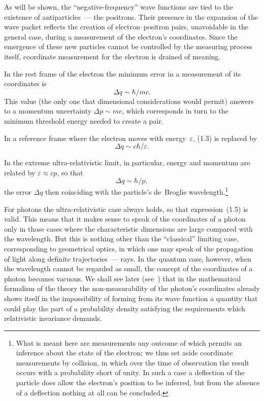 As will be shown, the ``negative-frequency'' wave functions are tied to the existence of antiparticles~--- the positrons. Their presence in the expansion of the wave packet reflects the creation of electron--positron pairs, unavoidable in the general case, during a measurement of the electron's coordinates. Since the emergence of these new particles cannot be controlled by the measuring process itself, coordinate measurement for the electron is drained of meaning.

In the rest frame of the electron the minimum error in a measurement of its coordinates is
\begin{equation}
\Delta q \sim \hbar/mc.
\tag{1.3}
\end{equation}
This value (the only one that dimensional considerations would permit) answers to a momentum uncertainty $\Delta p \sim mc$, which corresponds in turn to the minimum threshold energy needed to create a pair.

In a reference frame where the electron moves with energy~$\varepsilon$, (1.3) is replaced by
\begin{equation}
\Delta q \sim c\hbar/\varepsilon.
\tag{1.4}
\end{equation}

In the extreme ultra-relativistic limit, in particular, energy and momentum are related by $\varepsilon \approx cp$, so that
\begin{equation}
\Delta q \sim \hbar/p,
\tag{1.5}
\end{equation}
the error $\Delta q$ then coinciding with the particle's de~Broglie wavelength.\footnote{What is meant here are measurements any outcome of which permits an inference about the state of the electron; we thus set aside coordinate measurements by collision, in which over the time of observation the result occurs with a probability short of unity. In such a case a deflection of the particle does allow the electron's position to be inferred, but from the absence of a deflection nothing at all can be concluded.}

For photons the ultra-relativistic case always holds, so that expression~(1.5) is valid. This means that it makes sense to speak of the coordinates of a photon only in those cases where the characteristic dimensions are large compared with the wavelength. But this is nothing other than the ``classical'' limiting case, corresponding to geometrical optics, in which one may speak of the propagation of light along definite trajectories~--- rays. In the quantum case, however, when the wavelength cannot be regarded as small, the concept of the coordinates of a photon becomes vacuous. We shall see later (see~) that in the mathematical formalism of the theory the non-measurability of the photon's coordinates already shows itself in the impossibility of forming from its wave function a quantity that could play the part of a probability density satisfying the requirements which relativistic invariance demands.


